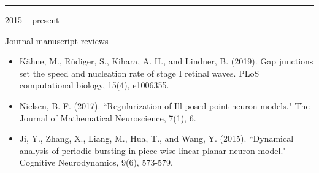 \documentclass[a4paper,10pt]{article}
\newlength{\cvcolumngapwidth}
\newlength{\cvleftcolumnwidth}
\newlength{\cvrightcolumnwidth}
\newcommand{\cvsectionstyle}[1]{{\normalsize\cvsectionfont\textcolor{cvsectioncolor}{#1}}}
\newcommand{\cvtitlestyle}[1]{{\large\cvtitlefont\textcolor{cvtitlecolor}{#1}}}
\newcommand{\cvheadingstyle}[1]{{\normalsize\cvheadingfont\textcolor{cvheadingcolor}{#1}}}
\newlength{\cvafteritemskipamount}
\newlength{\cvaftersectionskipamount}
\newlength{\cvbetweensectionandheadingextraskipamount}
\newlength{\cvaftertitleskipamount}
\newlength{\cvparskip}
\newcommand{\cvsection}[1]{
    \begin{minipage}[t]{\cvleftcolumnwidth}
        \raggedleft\cvsectionstyle{#1}
    \end{minipage}%
    \hspace{\cvcolumngapwidth}%
    \begin{minipage}[t]{\cvrightcolumnwidth}
        \textcolor{cvrulecolor}{\rule{\cvrightcolumnwidth}{0.3mm}}
    \end{minipage}

    \vspace{\cvaftersectionskipamount}
}
\newcommand{\cvitem}[2]{
    \begin{minipage}[t]{\cvleftcolumnwidth}
        \raggedleft #1
    \end{minipage}%
    \hspace{\cvcolumngapwidth}%
    \begin{minipage}[t]{\cvrightcolumnwidth}
        \setlength{\parskip}{\cvparskip} #2
    \end{minipage}

    \vspace{\cvafteritemskipamount}
}
\newcommand{\cvtitle}[1]{
    \cvtitlestyle{#1}

    \vspace{\cvaftertitleskipamount}
    \vspace{-\cvparskip}
}
\begin{document}
\cvsection{SERVICE}
\vspace{\cvbetweensectionandheadingextraskipamount}

\cvitem{
    \cvheadingstyle{2015 -- present}
}{
    \cvtitle{Journal manuscript reviews}
    \begin{itemize}[leftmargin=*]
        	\item K{\"a}hne, M., R{\"u}diger, S., Kihara, A. H., and Lindner, B. (2019). Gap junctions set the speed and nucleation rate of stage I retinal waves. PLoS computational biology, 15(4), e1006355.
	\item Nielsen, B. F. (2017). ``Regularization of Ill-posed point neuron models." The Journal of Mathematical Neuroscience, 7(1), 6.
	\item Ji, Y., Zhang, X., Liang, M., Hua, T., and Wang, Y. (2015). ``Dynamical analysis of periodic bursting in piece-wise linear planar neuron model." Cognitive Neurodynamics, 9(6), 573-579.
    \end{itemize}

}
\end{document}
